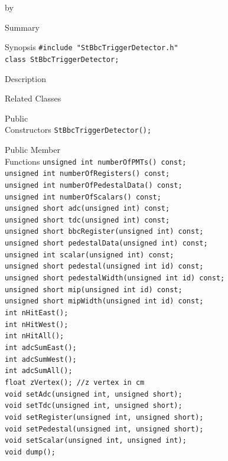\documentclass[twoside]{article}
\newcommand{\entrylabel}[1]{\mbox{\textbf{{#1}}}\hfil}%
\newenvironment{entry}
{\begin{list}{}%
    {\renewcommand{\makelabel}{\entrylabel}%
     \setlength{\labelwidth}{90pt}%
     \setlength{\leftmargin}{\labelwidth}
     \advance\leftmargin by \labelsep%
      }%
    }%
  {\end{list}}
\newcommand{\Entrylabel}[1]%
{\raisebox{0pt}[1ex][0pt]{\makebox[\labelwidth][l]%
    {\parbox[t]{\labelwidth}{\hspace{0pt}\textbf{{#1}}}}}}
\newenvironment{Entry}%
{\renewcommand{\entrylabel}{\Entrylabel}\begin{entry}}%
  {\end{entry}}
\begin{document}
\begin{Entry}
\item[Summary]
\item[Synopsis]
    \verb+#include "StBbcTriggerDetector.h"+\\
    \verb+class StBbcTriggerDetector;+\\
\item[Description]
\item[Related Classes]
\item[Public\\ Constructors]
    \verb+StBbcTriggerDetector();+\\
\item[Public Member\\ Functions]
    \verb+unsigned int numberOfPMTs() const;+\\
    \verb+unsigned int numberOfRegisters() const;+\\
    \verb+unsigned int numberOfPedestalData() const;+\\
    \verb+unsigned int numberOfScalars() const;+\\
    \verb+unsigned short adc(unsigned int) const;+\\
    \verb+unsigned short tdc(unsigned int) const;+\\
    \verb+unsigned short bbcRegister(unsigned int) const;+\\
    \verb+unsigned short pedestalData(unsigned int) const;+\\
    \verb+unsigned int scalar(unsigned int) const;+\\
    \verb+unsigned short pedestal(unsigned int id) const;+\\
    \verb+unsigned short pedestalWidth(unsigned int id) const;+\\
    \verb+unsigned short mip(unsigned int id) const;+\\
    \verb+unsigned short mipWidth(unsigned int id) const;+\\
    \verb+int nHitEast();+\\
    \verb+int nHitWest();+\\
    \verb+int nHitAll();+\\
    \verb+int adcSumEast(); +\\
    \verb+int adcSumWest();+\\
    \verb+int adcSumAll();+\\
    \verb+float zVertex(); //z vertex in cm+\\
    \verb+void setAdc(unsigned int, unsigned short);+\\
    \verb+void setTdc(unsigned int, unsigned short);+\\
    \verb+void setRegister(unsigned int, unsigned short);+\\
    \verb+void setPedestal(unsigned int, unsigned short);+\\
    \verb+void setScalar(unsigned int, unsigned int);+\\
    \verb+void dump();+\\
\end{Entry}
\clearpage
\end{document}
